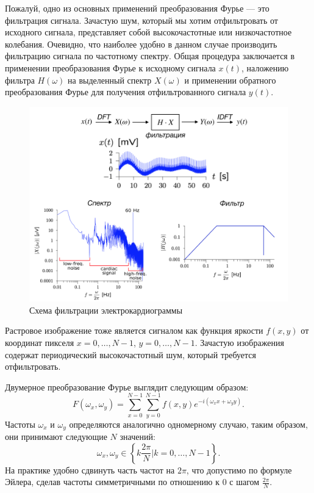 Пожалуй, одно из основных применений преобразования Фурье — это фильтрация сигнала. Зачастую шум, который мы хотим отфильтровать от исходного сигнала, представляет собой высокочастотные или низкочастотное колебания. Очевидно, что наиболее удобно в данном случае производить фильтрацию сигнала по частотному спектру. Общая процедура заключается в применении преобразования Фурье к исходному сигнала $x(t)$, наложению фильтра $H(\omega)$ на выделенный спектр $X(\omega)$ и применении обратного преобразования Фурье для получения отфильтрованного сигнала $y(t)$.
\begin{figure}[!htb]
\centering
\includegraphics[width=16cm]{chapters/grigorev_s1/pictures/s6}%
\caption{Схема фильтрации электрокардиограммы}
\end{figure}

Растровое изображение тоже является сигналом как функция яркости $f(x, y)$ от координат пикселя $x=0,\dots,N-1$, $y=0,\dots,N-1$. Зачастую изображения содержат периодический высокочастотный шум, который требуется отфильтровать.

Двумерное преобразование Фурье выглядит следующим образом:
$$F(\omega_x, \omega_y) = \sum \limits _{x=0}^{N-1} \sum \limits _{y=0}^{N-1} f(x, y) e^{-i (\omega_x x + \omega_y y)}.$$
Частоты $\omega_x$ и $\omega_y$ определяются аналогично одномерному случаю, таким образом, они  принимают следующие $N$ значений:
$$\omega_x, \omega_y \in \left\{ k \frac{2 \pi}{N} \Bigg| k=0,\dots,N-1 \right\} .$$
На практике удобно сдвинуть часть частот на $2 \pi$, что допустимо по формуле Эйлера, сделав частоты симметричными по отношению к $0$ с шагом $\frac{2 \pi}{N}$.

